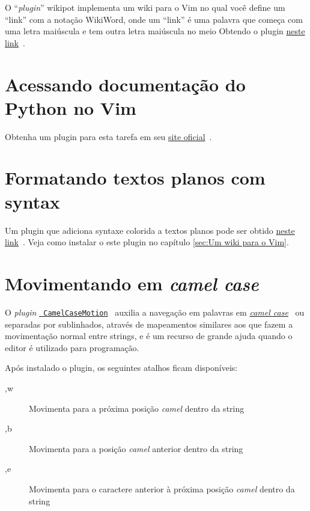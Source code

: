 O ``{\em plugin}'' wikipot implementa um wiki para o Vim no qual você define um
``link'' com a notação WikiWord, onde um ``link'' é uma palavra que começa com
uma letra maiúscula e tem outra letra maiúscula no meio Obtendo o plugin
\href{http://www.vim.org/scripts/script.php?script\_id=1018}{neste
link}~\cite{PluginPotWiki}.

\section{Acessando documentação do Python no Vim}\label{Acessando documentação do Python no Vim}
 Obtenha um plugin para esta tarefa em seu 
 \href{http://www.vim.org/scripts/script.php?script\_id=910}{site oficial}~\cite{PluginDocPython}.

\section{Formatando textos planos com syntax}\label{Formatando textos planos com syntax}

Um plugin que adiciona syntaxe colorida a textos planos pode ser obtido
\href{http://www.vim.org/scripts/script.php?script\_id=2208&rating=helpful#1.3}{neste
link}~\cite{PluginTextoPlano}.  Veja como instalar o este plugin no capítulo
\ref{sec:Um wiki para o Vim}.

\section{Movimentando em {\em camel case}}\label{Movimentando em camel case}

O {\em plugin} \href{http://www.vim.org/scripts/script.php?script\_id=1905}{{\tt
CamelCaseMotion}}~\cite{PluginCamelCaseMotion} auxilia a navegação em palavras em
\href{http://en.wikipedia.org/wiki/Camel\_case}{{\em camel case}}~\cite{WikipediaCamelCase} ou separadas
por sublinhados, através de mapeamentos similares aos que fazem a movimentação
normal entre strings, e é um recurso de grande ajuda quando o editor é
utilizado para programação. 

Após instalado o plugin, os seguintes atalhos ficam disponíveis:
\begin{description}
 \item [,w] Movimenta para a próxima posição {\em camel} dentro da string
 \item [,b] Movimenta para a posição {\em camel} anterior dentro da string
 \item [,e] Movimenta para o caractere anterior à próxima posição {\em camel} dentro da string
\end{description}

